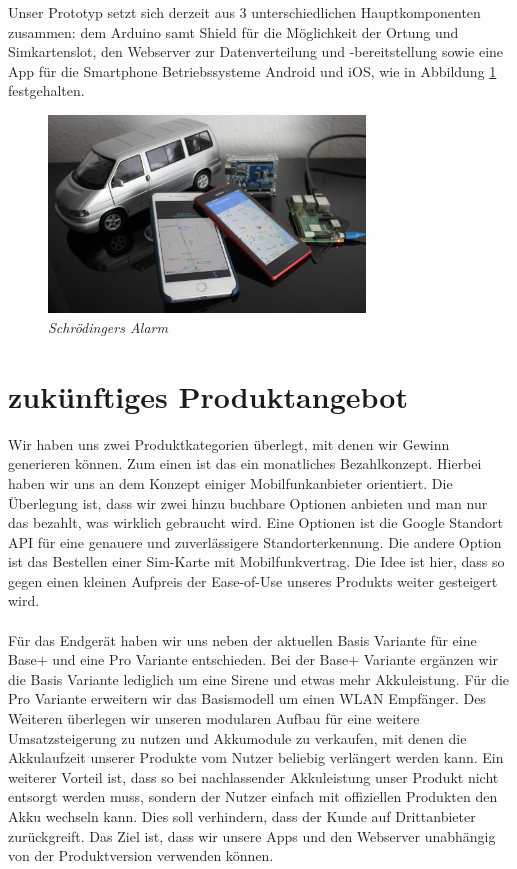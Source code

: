 Unser Prototyp setzt sich derzeit aus  3 unterschiedlichen Hauptkomponenten zusammen: dem Arduino samt Shield für die Möglichkeit der Ortung und Simkartenslot, den Webserver zur Datenverteilung und -bereitstellung sowie eine App für die Smartphone Betriebssysteme Android und iOS, wie in Abbildung \ref{product} festgehalten.

\begin{figure} [H]
	\begin{center}
		\includegraphics[width=0.75\textwidth]{Bilder/Produkt.jpg}
		\caption{\textit{Schrödingers Alarm}}
		\label{product}
	\end{center}
\end{figure}

\section{zukünftiges Produktangebot}
Wir haben uns zwei Produktkategorien überlegt, mit denen wir Gewinn generieren können. Zum einen ist das ein monatliches Bezahlkonzept. Hierbei haben wir uns an dem Konzept einiger Mobilfunkanbieter orientiert. Die Überlegung ist, dass wir zwei hinzu buchbare Optionen anbieten und man nur das bezahlt, was wirklich gebraucht wird. Eine Optionen ist die Google Standort API für eine genauere und zuverlässigere Standorterkennung. Die andere Option ist das Bestellen einer Sim-Karte mit Mobilfunkvertrag. Die Idee ist hier, dass so gegen einen kleinen Aufpreis der Ease-of-Use unseres Produkts weiter gesteigert wird.
\\
\\
Für das Endgerät haben wir uns neben der aktuellen Basis Variante für eine Base+ und eine Pro Variante entschieden. Bei der Base+ Variante ergänzen wir die Basis Variante lediglich um eine Sirene und etwas mehr Akkuleistung. Für die Pro Variante erweitern wir das Basismodell um einen WLAN Empfänger. Des Weiteren überlegen wir unseren modularen Aufbau für eine weitere Umsatzsteigerung zu nutzen und Akkumodule zu verkaufen, mit denen die Akkulaufzeit unserer Produkte vom Nutzer beliebig verlängert werden kann. Ein weiterer Vorteil ist, dass so bei nachlassender Akkuleistung unser Produkt nicht entsorgt werden muss, sondern der Nutzer einfach mit offiziellen Produkten den Akku wechseln kann. Dies soll verhindern, dass der Kunde auf Drittanbieter zurückgreift.
Das Ziel ist, dass wir unsere Apps und den Webserver unabhängig von der Produktversion verwenden können.

